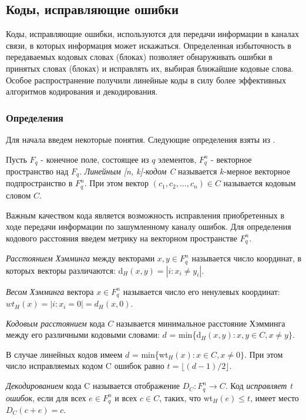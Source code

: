 \subsection{Коды, исправляющие ошибки}
Коды, исправляющие ошибки, используются для передачи информации в каналах связи, в которых информация может искажаться. Определенная избыточность в передаваемых кодовых словах (блоках) позволяет обнаруживать ошибки в принятых словах (блоках) и исправлять их, выбирая ближайшие кодовые слова. Особое распространение получили линейные коды в силу более эффективных алгоритмов кодирования и декодирования.
\subsubsection{Определения}
Для начала введем некоторые понятия. Следующие определения взяты из \cite{mal2023}. 
\begin{definition}
 Пусть $F_q$ - конечное поле, состоящее из $q$ элементов, $F_q^n$ - векторное пространство над $F_q$. \textit{Линейным [n, k]-кодом C} называется $k$-мерное векторное подпространство в $F_q^n$.
 При этом вектор $(c_1, c_2, . . . , c_n) \in C$ называется кодовым словом $C$.
\end{definition}
Важным качеством кода является возможность исправления приобретенных в ходе передачи информации по зашумленному каналу ошибок. Для определения кодового расстояния введем метрику на векторном пространстве $F_q^n$.
\begin{definition}
 \textit{Расстоянием Хэмминга} между векторами $x, y \in F_q^n$ называется число координат, в которых векторы различаются: d$_H(x, y) = |{i \colon x_i \neq y_i}|$. 
\end{definition}
\begin{definition}
 \textit{Весом Хэмминга} вектора $x \in F_q^n$ называется число его ненулевых координат: $wt_H(x) = |{i \colon x_i  = 0}| = d_H(x, 0)$.
\end{definition}
\begin{definition}
 \textit{Кодовым расстоянием} кода $C$ называется минимальное расстояние Хэмминга между его различными кодовыми словами: $d$ = min\{d$_H(x, y) \colon x, y \in C, x \neq y\}$. 
\end{definition}
В случае линейных кодов имеем $d$ = min\{wt$_H(x) \colon x \in C, x \neq 0\}$. При этом число исправляемых кодом C ошибок равно $t = \lfloor(d - 1)/2\rfloor$.
\begin{definition}[Декодирование]
 \textit{Декодированием} кода C называется отображение $D_C : F_q^n \longrightarrow C$. Код \textit{исправляет t ошибок}, если для всех $e \in F_q^n$ и всех $c \in C$, таких, что wt$_H(e) \leq t$, имеет место $D_C(c + e) = c$.
\end{definition}
